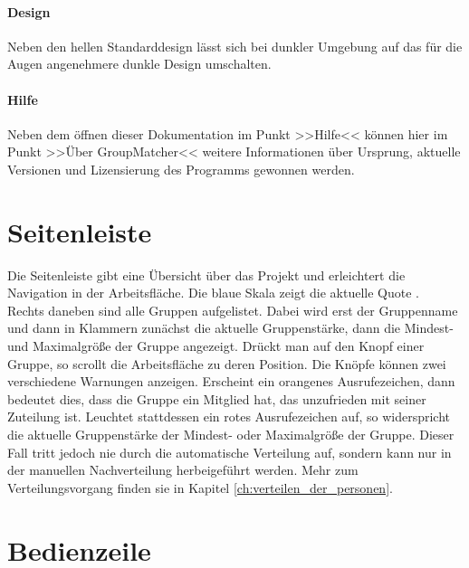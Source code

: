 \paragraph{Design} Neben den hellen Standarddesign lässt sich bei dunkler Umgebung auf das für die Augen angenehmere dunkle Design umschalten.

\paragraph{Hilfe} Neben dem öffnen dieser Dokumentation im Punkt >>Hilfe<< können hier im Punkt >>Über GroupMatcher<< weitere Informationen über Ursprung, aktuelle Versionen und Lizensierung des Programms gewonnen werden.

\section{Seitenleiste}
\label{sec:seitenleiste}

Die Seitenleiste gibt eine Übersicht über das Projekt und erleichtert die Navigation in der Arbeitsfläche. Die blaue Skala zeigt die aktuelle Quote .\\
Rechts daneben sind alle Gruppen aufgelistet. Dabei wird erst der Gruppenname und dann in Klammern zunächst die aktuelle Gruppenstärke, dann die Mindest- und Maximalgröße der Gruppe angezeigt. Drückt man auf den Knopf einer Gruppe, so scrollt die Arbeitsfläche zu deren Position. Die Knöpfe können zwei verschiedene Warnungen anzeigen. Erscheint ein orangenes Ausrufezeichen, dann bedeutet dies, dass die Gruppe ein Mitglied hat, das unzufrieden  mit seiner Zuteilung ist. Leuchtet stattdessen ein rotes Ausrufezeichen auf, so widerspricht die aktuelle Gruppenstärke der Mindest- oder Maximalgröße der Gruppe. Dieser Fall tritt jedoch nie durch die automatische Verteilung auf, sondern kann nur in der manuellen Nachverteilung herbeigeführt werden. Mehr zum Verteilungsvorgang finden sie in Kapitel \ref{ch:verteilen_der_personen}.

\section{Bedienzeile}
\label{sec:bedienzeile}

